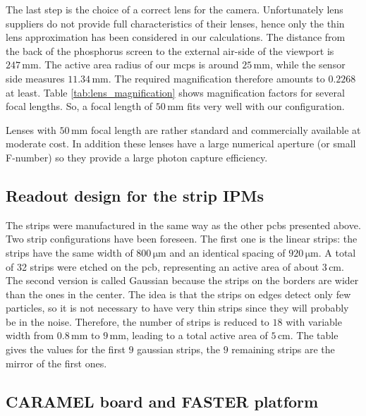 \begin{refsection}
  The last step is the choice of a correct lens for the camera.
  Unfortunately lens suppliers do not provide full characteristics of their lenses, hence only the thin lens approximation has been considered in our calculations. The distance from the back of the phosphorus screen to the external air-side of the viewport is $247\,\mathrm{mm}$. The active area radius of our \acrshort{mcp}s is around $25\,\mathrm{mm}$, while the sensor side measures $11.34\,\mathrm{mm}$. The required magnification therefore amounts to $0.2268$ at least.
  Table \ref{tab:lens_magnification} shows magnification factors for several focal lengths. So, a focal length of $50\,\mathrm{mm}$ fits very well with our configuration.
  

  Lenses with $50\,\mathrm{mm}$ focal length are rather standard and commercially available at moderate cost. In addition these lenses have a large numerical aperture (or small F-number) so they provide a large photon capture efficiency.

  \subsection{Readout design for the strip IPMs}

  The strips were manufactured in the same way as the other \acrshort{pcb}s presented above. Two strip configurations have been foreseen. The first one is the linear strips: the strips have the same width of $800\,\mathrm{\mu m}$ and an identical spacing of $920\,\mathrm{\mu m}$. A total of 32 strips were etched on the \acrshort{pcb}, representing an active area of about $3\,\mathrm{cm}$. The second version is called Gaussian because the strips on the borders are wider than the ones in the center. The idea is that the strips on edges detect only few particles, so it is not necessary to have very thin strips since they will probably be in the noise. Therefore, the number of strips is reduced to $18$ with variable width from $0.8\,\mathrm{mm}$ to $9\,\mathrm{mm}$, leading to a total active area of $5\,\mathrm{cm}$. The table gives the values for the first $9$ gaussian strips, the $9$ remaining strips are the mirror of the first ones.

  

  \subsection{CARAMEL board and FASTER platform}


\end{refsection}
